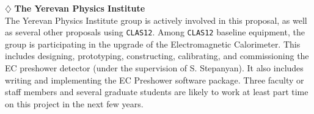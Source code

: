 \vskip 0.4cm

\noindent
$\diamondsuit$ {\bf The Yerevan Physics Institute} \\[0.2ex]

\noindent
The Yerevan Physics Institute group is actively involved in this
proposal, as well as several other proposals using {\tt CLAS12}.  Among
{\tt CLAS12} baseline equipment, the group is participating in the upgrade
of the Electromagnetic Calorimeter.  This includes designing, prototyping, 
constructing, calibrating, and commissioning the EC preshower detector (under 
the supervision of S. Stepanyan).  It also includes writing and implementing 
the EC Preshower software package.  Three faculty or staff members and 
several graduate students are likely to work at least part time on this 
project in the next few years.

\newpage

